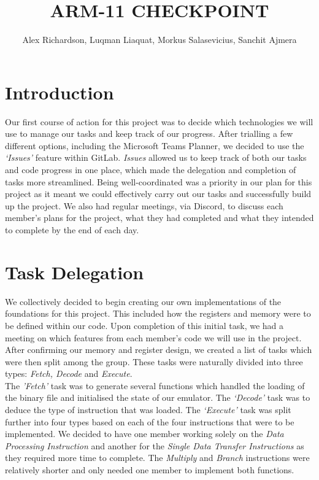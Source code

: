 \documentclass[10pt]{article}
\begin{document}
\title{\vspace{-2cm}ARM-11 CHECKPOINT}
 
\author{Alex Richardson, Luqman Liaquat, Morkus Salasevicius, Sanchit Ajmera}

\maketitle

\section*{Introduction}
Our first course of action for this project was to decide which technologies we will use to manage our tasks and keep track of our progress. After trialling a few different options, including the Microsoft Teams Planner, we decided to use the
\textsl{‘Issues’} feature within GitLab. \textsl{Issues} allowed us to keep track of both our tasks and code progress in one place, which made the delegation and completion of tasks more streamlined. Being well-coordinated was a priority in our plan for this project as it meant we could effectively carry out our tasks and successfully build up the project. We also had regular meetings, via Discord, to discuss each member’s plans for the project, what they had completed and what they intended to complete by the end of each day.

\section*{Task Delegation}
We collectively decided to begin creating our own implementations of the foundations for this project. This included how the registers and memory were to be defined within our code. Upon completion of this initial task, we had a meeting on which features from each member’s code we will use in the project. After confirming our memory and register design, we created a list of tasks which were then split among the group. These tasks were naturally divided into three types: \textsl{Fetch, Decode} and \textsl{Execute}.
\\

The \textsl{'Fetch'} task was to generate several functions which handled the loading of the binary file and initialised
the state of our emulator. The \textsl{‘Decode’} task was to deduce the type of instruction that was loaded. The \textsl{‘Execute’} task was split further into four types based on each of the four instructions that were to be implemented. We decided to have one member working solely on the \textsl{Data Processing Instruction} and another for the \textsl{Single Data Transfer Instructions} as they required more time to complete. The \textsl{Multiply} and \textsl{Branch} instructions were relatively shorter and only needed one member to implement both functions.
\end{document}
